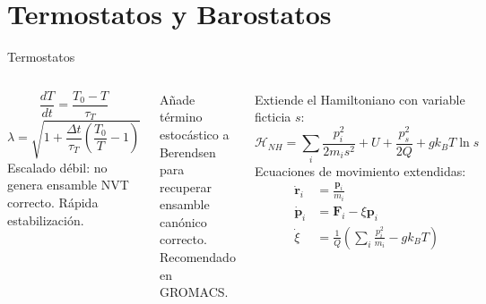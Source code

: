 \documentclass[aspectratio=169, 10pt]{beamer}
\begin{document}
\section{Termostatos y Barostatos}

\begin{frame}{Termostatos}
\begin{columns}[T]
\begin{tcolorbox}[formulabox, title={Berendsen}]
\small
\[
\frac{dT}{dt} = \frac{T_0 - T}{\tau_T}
\]
\[
\lambda = \sqrt{1 + \frac{\Delta t}{\tau_T}\left(\frac{T_0}{T} - 1\right)}
\]
{\scriptsize Escalado débil: no genera ensamble NVT correcto. Rápida estabilización.}
\end{tcolorbox}

\begin{tcolorbox}[definitionbox, title={Velocidad de rescalado (v-rescale)}]
\small
Añade término estocástico a Berendsen para recuperar ensamble canónico correcto. Recomendado en GROMACS.
\end{tcolorbox}

\begin{tcolorbox}[warningbox, title={Nosé-Hoover}]
\small
Extiende el Hamiltoniano con variable ficticia $s$:
\[
\mathcal{H}_{NH} = \sum_i \frac{p_i^2}{2m_i s^2} + U + \frac{p_s^2}{2Q} + g k_B T \ln s
\]
Ecuaciones de movimiento extendidas:
\begin{align*}
\dot{\mathbf{r}}_i &= \frac{\mathbf{p}_i}{m_i} \\
\dot{\mathbf{p}}_i &= \mathbf{F}_i - \xi \mathbf{p}_i \\
\dot{\xi} &= \frac{1}{Q}\left(\sum_i \frac{p_i^2}{m_i} - g k_B T\right)
\end{align*}
\end{tcolorbox}
\end{columns}
\end{frame}
\end{document}
